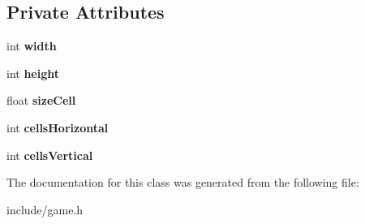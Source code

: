 \subsection*{Private Attributes}
\begin{DoxyCompactItemize}
\item 
int {\bfseries width}\hypertarget{classGame_a06b5a675d7c0f6a9b58d395872b1a4e7}{}\label{classGame_a06b5a675d7c0f6a9b58d395872b1a4e7}

\item 
int {\bfseries height}\hypertarget{classGame_aa6d1743c45de5558a0ca99078df85250}{}\label{classGame_aa6d1743c45de5558a0ca99078df85250}

\item 
float {\bfseries size\+Cell}\hypertarget{classGame_a022d477e012d53dde1affab23a93d8fc}{}\label{classGame_a022d477e012d53dde1affab23a93d8fc}

\item 
int {\bfseries cells\+Horizontal}\hypertarget{classGame_a17cd8aafeb1764f23847ce6b3e6d5fa7}{}\label{classGame_a17cd8aafeb1764f23847ce6b3e6d5fa7}

\item 
int {\bfseries cells\+Vertical}\hypertarget{classGame_a456a1c459655cddde0125f3a43339277}{}\label{classGame_a456a1c459655cddde0125f3a43339277}

\end{DoxyCompactItemize}


The documentation for this class was generated from the following file\+:\begin{DoxyCompactItemize}
\item 
include/game.\+h\end{DoxyCompactItemize}
